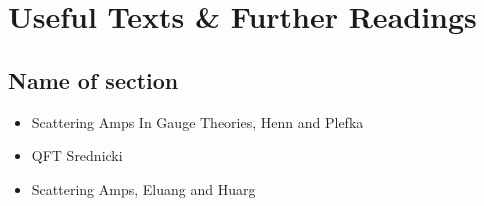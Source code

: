 \chapter*{Useful Texts \& Further Readings}

\section*{Name of section}
\begin{itemize}
    \item Scattering Amps In Gauge Theories, Henn and Plefka 
    \item QFT Srednicki 
    \item Scattering Amps, Eluang and Huarg
\end{itemize}

